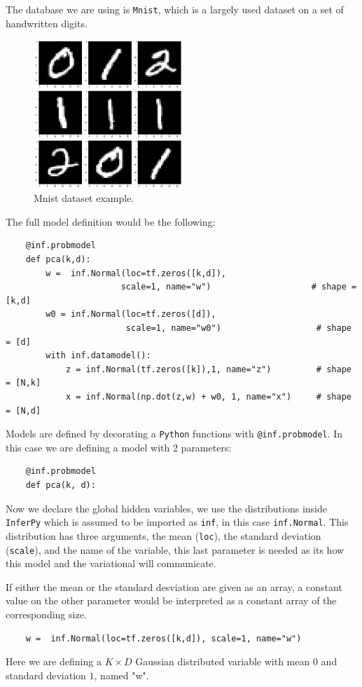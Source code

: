   The database we are using is \texttt{Mnist}, which is a largely used dataset on a set of handwritten digits.

\begin{figure}[h!]
    \centering
    \includegraphics[width=0.5\textwidth]{tex/images/mnist.png}
    \caption{Mnist dataset example.}
\end{figure}

The full model definition would be the following:
\begin{verbatim}
    @inf.probmodel
    def pca(k,d):
        w =  inf.Normal(loc=tf.zeros([k,d]),
                       scale=1, name="w")                    # shape = [k,d]
        w0 = inf.Normal(loc=tf.zeros([d]),
                        scale=1, name="w0")                   # shape = [d]
        with inf.datamodel():
            z = inf.Normal(tf.zeros([k]),1, name="z")         # shape = [N,k]
            x = inf.Normal(np.dot(z,w) + w0, 1, name="x")     # shape = [N,d]
\end{verbatim}

Models are defined by decorating a \texttt{Python} functions with \texttt{@inf.probmodel}. In this case we are defining a model with 2 parameters:

\begin{verbatim}
    @inf.probmodel
    def pca(k, d):
\end{verbatim}

Now we declare the global hidden variables, we use the distributions inside \texttt{InferPy} which is assumed to be imported as \texttt{inf}, in this case \texttt{inf.Normal}. This distribution has three arguments, the mean (\texttt{loc}), the standard deviation (\texttt{scale}), and the name of the variable, this last parameter is needed as its how this model and the variational will communicate.

If either the mean or the standard desviation are given as an array, a constant value on the other parameter would be interpreted as a constant array of the corresponding size.
\begin{verbatim}
    w =  inf.Normal(loc=tf.zeros([k,d]), scale=1, name="w")                   
\end{verbatim}
Here we are defining a \( K\times D \)  Gaussian distributed variable with mean \( 0 \) and standard deviation \( 1 \), named "w".


